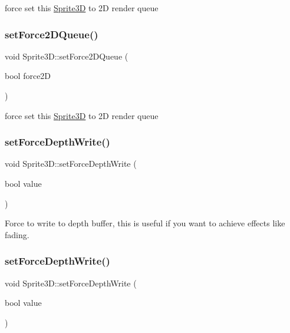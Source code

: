 force set this \hyperlink{classSprite3D}{Sprite3D} to 2D render queue \mbox{\label{classSprite3D_af1ed52e0440a81ce14577834b5073e1d}} 
\subsubsection{\texorpdfstring{set\+Force2\+D\+Queue()}{setForce2DQueue()}\hspace{0.1cm}{\footnotesize\ttfamily [2/2]}}
{\footnotesize\ttfamily void Sprite3\+D\+::set\+Force2\+D\+Queue (\begin{DoxyParamCaption}\item[{bool}]{force2D }\end{DoxyParamCaption})}

force set this \hyperlink{classSprite3D}{Sprite3D} to 2D render queue \mbox{\label{classSprite3D_ae6bea19d97b02dfecb63d8975600aa4a}} 
\subsubsection{\texorpdfstring{set\+Force\+Depth\+Write()}{setForceDepthWrite()}\hspace{0.1cm}{\footnotesize\ttfamily [1/2]}}
{\footnotesize\ttfamily void Sprite3\+D\+::set\+Force\+Depth\+Write (\begin{DoxyParamCaption}\item[{bool}]{value }\end{DoxyParamCaption})\hspace{0.3cm}{\ttfamily [inline]}}

Force to write to depth buffer, this is useful if you want to achieve effects like fading. \mbox{\label{classSprite3D_ae6bea19d97b02dfecb63d8975600aa4a}} 
\subsubsection{\texorpdfstring{set\+Force\+Depth\+Write()}{setForceDepthWrite()}\hspace{0.1cm}{\footnotesize\ttfamily [2/2]}}
{\footnotesize\ttfamily void Sprite3\+D\+::set\+Force\+Depth\+Write (\begin{DoxyParamCaption}\item[{bool}]{value }\end{DoxyParamCaption})\hspace{0.3cm}{\ttfamily [inline]}}

